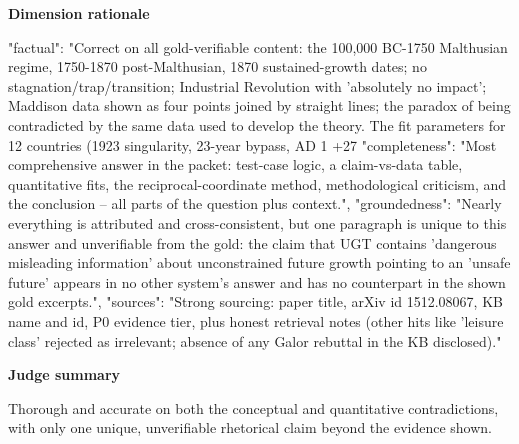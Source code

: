 \documentclass[10pt]{article}
\begin{document}
\textbf{Dimension rationale}
\begin{EvidenceText}
{
  "factual": "Correct on all gold-verifiable content: the 100,000 BC-1750 Malthusian regime, 1750-1870 post-Malthusian, 1870 sustained-growth dates; no stagnation/trap/transition; Industrial Revolution with 'absolutely no impact'; Maddison data shown as four points joined by straight lines; the paradox of being contradicted by the same data used to develop the theory. The fit parameters for 12 countries (1923 singularity, 23-year bypass, AD 1 +27%
  "completeness": "Most comprehensive answer in the packet: test-case logic, a claim-vs-data table, quantitative fits, the reciprocal-coordinate method, methodological criticism, and the conclusion -- all parts of the question plus context.",
  "groundedness": "Nearly everything is attributed and cross-consistent, but one paragraph is unique to this answer and unverifiable from the gold: the claim that UGT contains 'dangerous misleading information' about unconstrained future growth pointing to an 'unsafe future' appears in no other system's answer and has no counterpart in the shown gold excerpts.",
  "sources": "Strong sourcing: paper title, arXiv id 1512.08067, KB name and id, P0 evidence tier, plus honest retrieval notes (other hits like 'leisure class' rejected as irrelevant; absence of any Galor rebuttal in the KB disclosed)."
}
\end{EvidenceText}

\textbf{Judge summary}
\begin{EvidenceText}
Thorough and accurate on both the conceptual and quantitative contradictions, with only one unique, unverifiable rhetorical claim beyond the evidence shown.
\end{EvidenceText}
\end{document}
